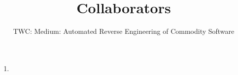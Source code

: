 \documentclass[letterpaper,11pt]{scrartcl}
\newcommand{\thetitle}{TWC: Medium: Automated Reverse Engineering of Commodity Software\xspace}
\begin{document}
\title{Collaborators}
\subtitle{\thetitle}
\author{}
\date{}
\maketitle

\begin{enumerate}
    \item
\end{enumerate}
\end{document}
